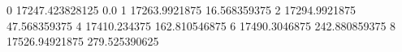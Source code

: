0 17247.423828125 0.0
1 17263.9921875 16.568359375
2 17294.9921875 47.568359375
4 17410.234375 162.810546875
6 17490.3046875 242.880859375
8 17526.94921875 279.525390625
